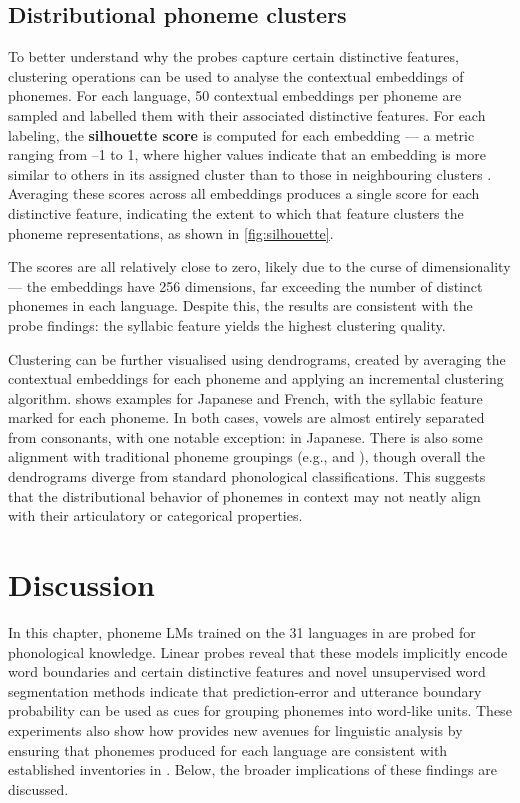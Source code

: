 \subsection{Distributional phoneme clusters}

To better understand why the probes capture certain distinctive features, clustering operations can be used to analyse the contextual embeddings of phonemes. For each language, 50 contextual embeddings per phoneme are sampled and labelled them with their associated distinctive features. For each labeling, the \textbf{silhouette score} is computed for each embedding --- a metric ranging from –1 to 1, where higher values indicate that an embedding is more similar to others in its assigned cluster than to those in neighbouring clusters \citep{rousseeuw1987}. Averaging these scores across all embeddings produces a single score for each distinctive feature, indicating the extent to which that feature clusters the phoneme representations, as shown in \cref{fig:silhouette}.

The scores are all relatively close to zero, likely due to the curse of dimensionality --- the embeddings have 256 dimensions, far exceeding the number of distinct phonemes in each language. Despite this, the results are consistent with the probe findings: the syllabic feature yields the highest clustering quality.

Clustering can be further visualised using dendrograms, created by averaging the contextual embeddings for each phoneme and applying an incremental clustering algorithm.  shows examples for Japanese and French, with the syllabic feature marked for each phoneme. In both cases, vowels are almost entirely separated from consonants, with one notable exception:  in Japanese. There is also some alignment with traditional phoneme groupings (e.g.,  and ), though overall the dendrograms diverge from standard phonological classifications. This suggests that the distributional behavior of phonemes in context may not neatly align with their articulatory or categorical properties.

\section{Discussion}\label{sec:15-discussion}

In this chapter, phoneme LMs trained on the 31 languages in \ipachildes are probed for phonological knowledge. Linear probes reveal that these models implicitly encode word boundaries and certain distinctive features and novel unsupervised word segmentation methods indicate that prediction-error and utterance boundary probability can be used as cues for grouping phonemes into word-like units. These experiments also show how \gpp provides new avenues for linguistic analysis by ensuring that phonemes produced for each language are consistent with established inventories in \phoible. Below, the broader implications of these findings are discussed.

